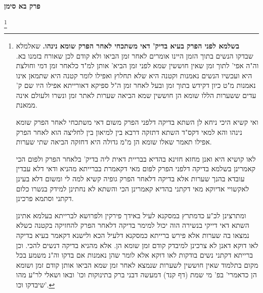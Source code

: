 \documentclass[12pt, openany]{book}
\newcommand{\sethebfont}{
\fontsize{10.5pt}{21.0pt} \selectfont
}
\newcommand{\twocol}[1]{
	{\sethebfont \begin{multicols}{2}
			#1
	\end{multicols}}	
}
\newcommand{\chapname}{}
\newcommand{\newchap}[1]{
	\addcontentsline{toc}{chapter}{#1}
	\renewcommand{\chapname}{#1}
		\begin{center}
			\textbf{%
\fontsize{16pt}{16pt}\selectfont
				#1}
		\end{center}
}
\newcommand{\footnotecomment}[1]{\footnote{#1}}
\newcommand{\commenta}[1]{\footnotecomment{#1}}
\begin{document}
\newchap{פרק  בא סימן}
\twocol{
\commenta{\textbf{בשלמא לפני הפרק בעיא בדיק' דאי משתכחי לאחר הפרק שומא נינהו.}  שאלמלא שבדקו הנשים בתוך הזמן היינו אומרים לאחר זמן הביאו ולא קודם לכן שאורח בזמנו בא. וה"ה אפי' לתוך זמן שאין חוששין שמא לפני זמן הביא' אותן למ"ד כלאחר זמן דמי וחולצת היא ועכשיו הנשים נאמנות וקטנה היא שלא תחלוץ ואפילו לומר קטנה היא שתמאן אינו נאמנות מ"ט כיון דקידש בתוך זמן ובעל לאחר זמן ה"ל ספיקא דאורייתא אפילו היו שם ק' עדים ששערות הללו שומא הן חוששין שמא הביאה שערות לאתר זמן ונשרו ולעולם אינה ממאנת.\par ואי קשיא היכי ניחא לן השתא בדיקה דלפני הפרק משום דאי משתכחי לאחר הפרק שומא נינהו והא למאי דקס"ד השתא דתזקה דרבא בין למיאון בין לחליצה הוא לאחר הפרק אפילו תאמר שאלו שומא הן מ"מ גדולה היא דחזקה הביאה שתי שערות.\par  לאו קושיא היא ואנן מחזא חזינא בהדיא בבריית דאית ליה בדיק' בלאחר הפרק ולפום הכי קאמרינן בשלמא בדיקה דלפני הפרק לפום מאי דקאמרת בברייתא מהניא ודאי דלא עבדין עובדא בהנך שערות אלא בדיקה דלאחר הפרק גופיה קשיא למה לי ומשום דלא בעינן לאקשויי אדיוקא מאי דקתני בהדיא קאמרינן הכי והשתא לא נחתינן למידק בנשרו כלום דקתני וסתמא פרכינן.\par  ומתרצינן לכ"ע כדמתרץ במסקנא לעיל באידך פירקין ולפרושא לברייתא בעלמא אתינן השתא דאי דייקי בנשירה הוה יכול למימר בדיקה דלאחר הפרק להחזיקה בקטנה כשלא נמצאו בה שערות אלא פירש ברייתא כמסקנא דלעיל הכא ולישנא דקאמר בעיא בדיקה לאו דוקא דאנן לא צרכינן למיבדק קודם זמן שומא הן. אלא מהניא בדיקה דנשים להכי. וכן ברייתא דקתני נשים בודקות לאו דוקא אלא לומר שהן נאמנות אם בדקו וה"נ משמע בכל מקום בתלמוד שאין חוששין לשערות שנמצא לאחר זמן שמא הביאו אותן קודם זמן ושומא הן כדאמרי' בפ' מי שמת (דף קנד) דמעשה דבני ברק בתינוקות וכו' ובאו ושאלי לר"ע מהו שיבדקו וכו'. }

}
\end{document}
